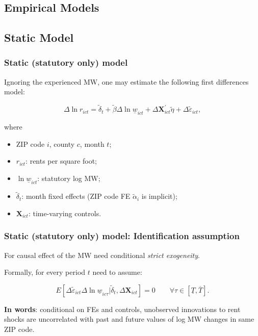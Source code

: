 
\subsection{Empirical Models}

\subsection{Static Model}

\begin{frame}[label = stat_only_model]
	\frametitle{Static (statutory only) model}
	
	Ignoring the experienced MW, one may estimate the following first differences model:
	
	$$
	\Delta \ln r_{ict} = \tilde\delta_t + 
	\tilde\beta \Delta \ln \underline{w}_{ict} + 
	\Delta \mathbf{X}^{'}_{ict} \tilde\eta + 
	\Delta \tilde\varepsilon_{ict} ,
	$$
	
	where	
	\begin{itemize} \small
	\item ZIP code $i$, county $c$, month $t$;
	
	\item \vspace{1mm} $r_{ict}$: rents per square foot;
	
	\item \vspace{1mm} $\ln \underline{w}_{ict}$: statutory log MW;
	
	\item \vspace{1mm} $\tilde\delta_t$: month fixed effects (ZIP code FE $\tilde\alpha_i 
	$ is 
	implicit);
	
	\item \vspace{.5mm} $\mathbf{X}_{ict}$: time-varying controls.
	\end{itemize}
\end{frame}

\begin{frame}
	\frametitle{Static (statutory only) model: Identification assumption}
	
	For causal effect of the MW need conditional \textit{strict exogeneity}.
	
	\vspace{1.5mm}
	Formally, for every period $t$ need to assume:
	
	$$
	E \left[\Delta \tilde\varepsilon_{ict} \Delta \ln \underline{w}_{ic\tau}  
	\big| \tilde\delta_t, \Delta \mathbf{X}_{ict} \right] = 0
	\quad \quad \forall \tau \in \left[ \underline{T}, \overline{T} \right] .
	$$
	
	\pause
	\vspace{2mm}
	\textbf{In words}: conditional on FEs and controls, unobserved innovations to rent 
	shocks are uncorrelated with past and future values of log MW changes {\color{blue} 
	in same ZIP code}.
	
\end{frame}

